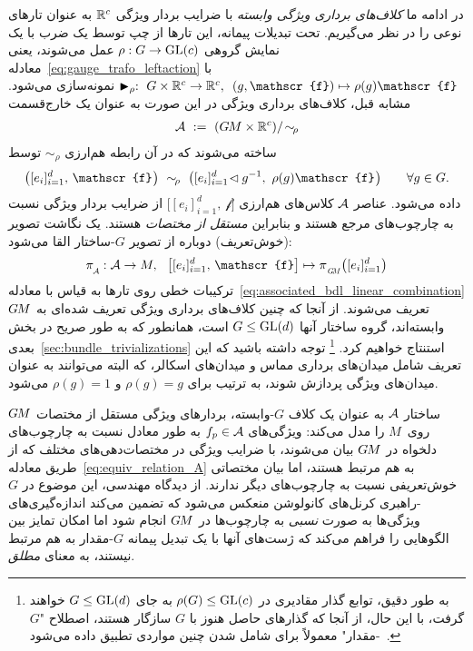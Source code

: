 در ادامه ما \emph{کلاف‌های برداری ویژگی وابسته} با ضرایب بردار ویژگی $\mathbb{R}^c$ به عنوان تارهای نوعی را در نظر می‌گیریم.
تحت تبدیلات پیمانه، این تارها از چپ توسط یک ضرب با یک نمایش گروهی $\rho:G\to\operatorname{GL}(c)$ عمل می‌شوند، یعنی معادله~\eqref{eq:gauge_trafo_leftaction} با $\blacktriangleright_\rho:\ {G\times\R^c \to \R^c,}\ \ {(g,\mathscr{f}) \mapsto \rho(g)\mathscr{f}}$ نمونه‌سازی می‌شود.
مشابه قبل، کلاف‌های برداری ویژگی در این صورت به عنوان یک خارج‌قسمت
\begin{align}\label{eq:associated_bundle_def}
	\mathcal{A}\ :=\ (G\mkern-1.4muM\times\mathbb{R}^c)/\!\sim_{\!\rho}
\end{align}
ساخته می‌شوند که در آن رابطه هم‌ارزی $\sim_{\!\rho}$ توسط
\begin{align}\label{eq:equiv_relation_A}
	\big([e_i]_{i=1}^d,\, \mathscr{f} \mkern1mu\big)\ \sim_{\!\rho}\ 
	\big([e_i]_{i=1}^d\!\lhd g^{-1},\ \rho(g) \mathscr{f} \mkern1mu\big) \qquad\forall g\in G.
\end{align}
داده می‌شود.
عناصر $\mathcal{A}$ کلاس‌های هم‌ارزی $\big[[e_i]_{i=1}^d,\ \mathscr{f}\big]$ از ضرایب بردار ویژگی نسبت به چارچوب‌های مرجع هستند و بنابراین \emph{مستقل از مختصات} هستند.
یک نگاشت تصویر (خوش‌تعریف) دوباره از تصویر $G$-ساختار القا می‌شود:
\begin{align}\label{eq:associated_A_proj}
	\piA: \A \to M,\ \ 
	\big[[e_i]_{i=1}^d,\,\mathscr{f}\big] \mapsto \piGM \big( [e_i]_{i=1}^d \big)
\end{align}
ترکیبات خطی روی تارها به قیاس با معادله~\eqref{eq:associated_bdl_linear_combination} تعریف می‌شوند.
از آنجا که چنین کلاف‌های برداری ویژگی تعریف شده‌ای به $G\mkern-1.4muM$ وابسته‌اند، گروه ساختار آنها $G\leq\operatorname{GL}(d)$ است، همانطور که به طور صریح در بخش بعدی~\ref{sec:bundle_trivializations} استنتاج خواهیم کرد.%
\footnote{
	به طور دقیق، توابع گذار مقادیری در $\rho(G) \leq \operatorname{GL}(c)$ به جای $G \leq \operatorname{GL}(d)$ خواهند گرفت، با این حال، از آنجا که گذارهای حاصل هنوز با $G$ سازگار هستند، اصطلاح "$G$-مقدار" معمولاً برای شامل شدن چنین مواردی تطبیق داده می‌شود~\cite{wendlLectureNotesBundles2008}.
}
توجه داشته باشید که این تعریف شامل میدان‌های برداری مماس و میدان‌های اسکالر، که البته می‌توانند به عنوان میدان‌های ویژگی پردازش شوند، به ترتیب برای $\rho(g)=g$ و $\rho(g)=1$ می‌شود.


ساختار $\mathcal{A}$ به عنوان یک کلاف $G$-وابسته، بردارهای ویژگی مستقل از مختصات $G\mkern-1.4muM$ روی~$M$ را مدل می‌کند:
ویژگی‌های $f_p \in \mathcal{A}$ به طور معادل نسبت به چارچوب‌های دلخواه در $G\mkern-1.4muM$ بیان می‌شوند، با ضرایب ویژگی در مختصات‌دهی‌های مختلف که از طریق معادله~\eqref{eq:equiv_relation_A} به هم مرتبط هستند، اما بیان مختصاتی خوش‌تعریفی نسبت به چارچوب‌های دیگر ندارند.
از دیدگاه مهندسی، این موضوع در $G$-راهبری کرنل‌های کانولوشن منعکس می‌شود که تضمین می‌کند اندازه‌گیری‌های ویژگی‌ها به صورت \emph{نسبی} به چارچوب‌ها در $G\mkern-1.4muM$ انجام شود اما امکان تمایز بین الگوهایی را فراهم می‌کند که ژست‌های آنها با یک تبدیل پیمانه $G$-مقدار به هم مرتبط نیستند، به معنای \emph{مطلق}.


